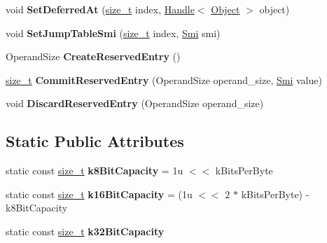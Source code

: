 \begin{DoxyCompactItemize}
void {\bfseries Set\+Deferred\+At} (\mbox{\hyperlink{classsize__t}{size\+\_\+t}} index, \mbox{\hyperlink{classv8_1_1internal_1_1Handle}{Handle}}$<$ \mbox{\hyperlink{classv8_1_1internal_1_1Object}{Object}} $>$ object)
\item 
\mbox{\label{classv8_1_1internal_1_1interpreter_1_1ConstantArrayBuilder_a5c010c753f700c3fdd5568a4b724c320}} 
void {\bfseries Set\+Jump\+Table\+Smi} (\mbox{\hyperlink{classsize__t}{size\+\_\+t}} index, \mbox{\hyperlink{classv8_1_1internal_1_1Smi}{Smi}} smi)
\item 
\mbox{\label{classv8_1_1internal_1_1interpreter_1_1ConstantArrayBuilder_a8fda4e9726a5a415f50df4b2174a7bfe}} 
Operand\+Size {\bfseries Create\+Reserved\+Entry} ()
\item 
\mbox{\label{classv8_1_1internal_1_1interpreter_1_1ConstantArrayBuilder_a0ae26a5c98431579c4526db3d5324428}} 
\mbox{\hyperlink{classsize__t}{size\+\_\+t}} {\bfseries Commit\+Reserved\+Entry} (Operand\+Size operand\+\_\+size, \mbox{\hyperlink{classv8_1_1internal_1_1Smi}{Smi}} value)
\item 
\mbox{\label{classv8_1_1internal_1_1interpreter_1_1ConstantArrayBuilder_a38ce057d19d0131b717c39e9c159d2c2}} 
void {\bfseries Discard\+Reserved\+Entry} (Operand\+Size operand\+\_\+size)
\end{DoxyCompactItemize}
\subsection*{Static Public Attributes}
\begin{DoxyCompactItemize}
\item 
\mbox{\label{classv8_1_1internal_1_1interpreter_1_1ConstantArrayBuilder_a185835694d75f46dec545714852bc191}} 
static const \mbox{\hyperlink{classsize__t}{size\+\_\+t}} {\bfseries k8\+Bit\+Capacity} = 1u $<$$<$ k\+Bits\+Per\+Byte
\item 
\mbox{\label{classv8_1_1internal_1_1interpreter_1_1ConstantArrayBuilder_aa8e09522d1215aaf36760e41c0ca6403}} 
static const \mbox{\hyperlink{classsize__t}{size\+\_\+t}} {\bfseries k16\+Bit\+Capacity} = (1u $<$$<$ 2 $\ast$ k\+Bits\+Per\+Byte) -\/ k8\+Bit\+Capacity
\item 
static const \mbox{\hyperlink{classsize__t}{size\+\_\+t}} {\bfseries k32\+Bit\+Capacity}
\end{DoxyCompactItemize}


